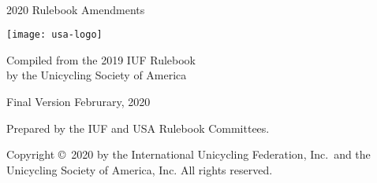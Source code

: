 \begin{titlepage}
\centering
\ \\

{\Huge 2020 Rulebook Amendments}
\vspace{5mm}

\texttt{[image: usa-logo]}

\vspace{5mm}
{\Large Compiled from the 2019 IUF Rulebook\\ }
\vspace{3mm}
{\Large by the Unicycling Society of America}

\vspace{8mm}
{\Large Final Version \quad Februrary, 2020}

\vspace{40mm}
Prepared by the IUF and USA Rulebook Committees.

\vspace{5mm}
{\small Copyright \copyright\ 2020 by the International Unicycling Federation, Inc.\ and the Unicycling Society of America, Inc. All rights reserved.}

\end{titlepage}
